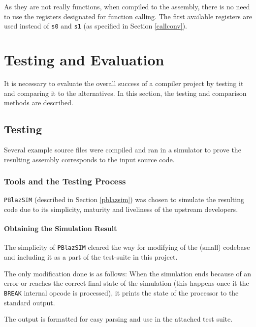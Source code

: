     As they are not really functions, when compiled to the assembly, there is no need to use the registers designated for function calling. The first available registers are used instead of \texttt{s0} and \texttt{s1} (as specified in Section \ref{callconv}).


\chapter{Testing and Evaluation}\label{evaluation}

It is necessary to evaluate the overall success of a compiler project by testing it and comparing it to the alternatives. In this section, the testing and comparison methods are described.

    \section{Testing}\label{testing}
 
    Several example source files were compiled and ran in a simulator to prove the resulting assembly corresponds to the input source code.

        \subsection{Tools and the Testing Process}

        \texttt{PBlazSIM} (described in Section \ref{pblazsim}) was chosen to simulate the resulting code due to its simplicity, maturity and liveliness of the upstream developers.

            \subsubsection{Obtaining the Simulation Result}

                The simplicity of \texttt{PBlazSIM} cleared the way for modifying of the (small) codebase and including it as a part of the test-suite in this project.

                The only modification done is as follows: When the simulation ends because of an error or reaches the correct final state of the simulation (this happens once it  the \texttt{BREAK} internal opcode is processed), it prints the state of the processor to the standard output.

                The output is formatted for easy parsing and use in the attached test suite.


